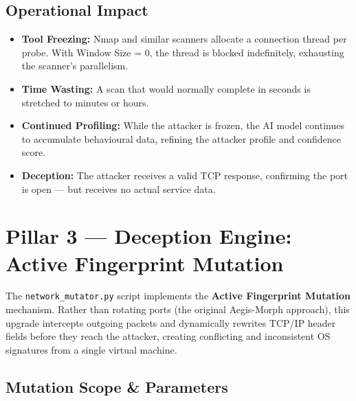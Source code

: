 \documentclass[12pt,a4paper]{report}
\begin{document}
\section{Operational Impact}

\begin{itemize}[nosep, leftmargin=1.5em]
  \item \textbf{Tool Freezing:} Nmap and similar scanners allocate a connection thread per
        probe. With Window Size = 0, the thread is blocked indefinitely, exhausting the
        scanner's parallelism.
  \item \textbf{Time Wasting:} A scan that would normally complete in seconds is stretched
        to minutes or hours.
  \item \textbf{Continued Profiling:} While the attacker is frozen, the AI model continues
        to accumulate behavioural data, refining the attacker profile and confidence score.
  \item \textbf{Deception:} The attacker receives a valid TCP response, confirming the port
        is open --- but receives no actual service data.
\end{itemize}

\chapter{Pillar 3 --- Deception Engine: Active Fingerprint Mutation}

The \texttt{network\_mutator.py} script implements the \textbf{Active Fingerprint Mutation}
mechanism. Rather than rotating ports (the original Aegis-Morph approach), this upgrade
intercepts outgoing packets and dynamically rewrites TCP/IP header fields before they reach
the attacker, creating conflicting and inconsistent OS signatures from a single virtual machine.

\section{Mutation Scope \& Parameters}
\end{document}
